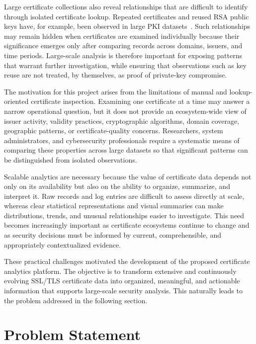 Large certificate collections also reveal relationships that are difficult to
identify through isolated certificate lookup. Repeated certificates and reused
RSA public keys have, for example, been observed in large PKI datasets~\cite{nezhadian2025reuse}.
Such relationships may remain hidden when certificates are examined
individually because their significance emerges only after comparing records
across domains, issuers, and time periods. Large-scale analysis is therefore
important for exposing patterns that warrant further investigation, while
ensuring that observations such as key reuse are not treated, by themselves,
as proof of private-key compromise.

The motivation for this project arises from the limitations of manual and
lookup-oriented certificate inspection. Examining one certificate at a time may
answer a narrow operational question, but it does not provide an ecosystem-wide
view of issuer activity, validity practices, cryptographic algorithms, domain
coverage, geographic patterns, or certificate-quality concerns. Researchers,
system administrators, and cybersecurity professionals require a systematic
means of comparing these properties across large datasets so that significant
patterns can be distinguished from isolated observations.

Scalable analytics are necessary because the value of certificate data depends
not only on its availability but also on the ability to organize, summarize,
and interpret it. Raw records and log entries are difficult to assess directly
at scale, whereas clear statistical representations and visual summaries can
make distributions, trends, and unusual relationships easier to investigate.
This need becomes increasingly important as certificate ecosystems continue to
change and as security decisions must be informed by current, comprehensible,
and appropriately contextualized evidence.

These practical challenges motivated the development of the proposed certificate 
analytics platform. The objective is to transform extensive and continuously evolving
SSL/TLS certificate data into organized, meaningful, and actionable information that
supports large-scale security analysis. This naturally leads to the problem addressed
in the following section.

\section{Problem Statement}
\label{sec:problem-statement}

